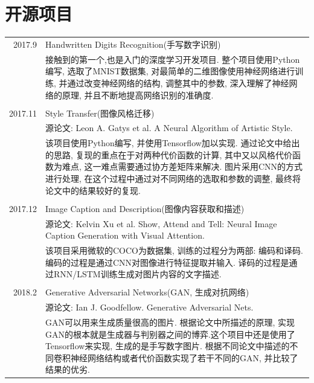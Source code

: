 \documentclass[a4paper,11pt]{article}
\begin{document}
\section{开源项目}
\begin{tabular}{r|p{11cm}}
 \textsc{2017.9} & Handwritten Digits Recognition(手写数字识别) \\&\footnotesize{接触到的第一个,也是入门的深度学习开发项目. 整个项目使用Python编写, 选取了MNIST数据集, 对最简单的二维图像使用神经网络进行训练, 并通过改变神经网络的结构, 调整其中的参数, 深入理解了神经网络的原理, 并且不断地提高网络识别的准确度.}\\\multicolumn{2}{c}{} \\
 \textsc{2017.11} & Style Transfer(图像风格迁移)\\&\footnotesize{源论文: Leon A. Gatys et al. A Neural Algorithm of Artistic Style.}\\&\footnotesize{该项目使用Python编写, 并使用Tensorflow加以实现. 通过论文中给出的思路, 复现的重点在于对两种代价函数的计算, 其中又以风格代价函数为难点, 这一难点需要通过协方差矩阵来解决. 图片采用CNN的方式进行处理, 在这个过程中通过对不同网络的选取和参数的调整, 最终将论文中的结果较好的复现. }\\\multicolumn{2}{c}{} \\
 \textsc{2017.12} & Image Caption and Description(图像内容获取和描述)\\&\footnotesize{源论文: Kelvin Xu et al. Show, Attend and Tell: Neural Image Caption
Generation with Visual Attention.}\\&\footnotesize{该项目采用微软的COCO为数据集, 训练的过程分为两部: 编码和译码. 编码的过程是通过CNN对图像进行特征提取并输入. 译码的过程是通过RNN/LSTM训练生成对图片内容的文字描述.  }\\\multicolumn{2}{c}{} \\
\textsc{2018.2} & Generative Adversarial Networks(GAN, 生成对抗网络)\\&\footnotesize{源论文: Ian J. Goodfellow. Generative Adversarial Nets.}\\&\footnotesize{GAN可以用来生成质量很高的图片. 根据论文中所描述的原理, 实现GAN的根本就是生成器与判别器之间的博弈.这个项目中还是使用了Tensorflow来实现, 生成的是手写数字图片. 根据不同论文中描述的不同卷积神经网络结构或者代价函数实现了若干不同的GAN, 并比较了结果的优劣.}
\end{tabular}

\end{document}
